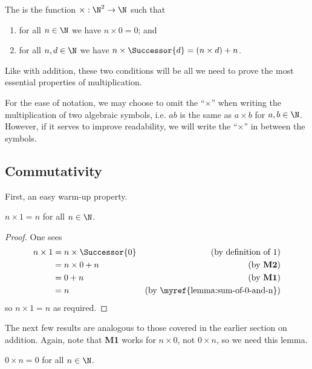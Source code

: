 \begin{definition}[Multiplication]
    The  is the function $\times: \N^2 \to \N$ such that
    \begin{enumerate}[label=\textbf{M\arabic*.}]
        \item for all $n \in \N$ we have $n \times 0 = 0$; and
        \item for all $n, d \in \N$ we have $n \times \Successor{d} = (n \times d) + n$.
    \end{enumerate}
\end{definition}

Like with addition, these two conditions will be all we need to prove the most essential properties of multiplication.

For the ease of notation, we may choose to omit the ``$\times$'' when writing the multiplication of two algebraic symbols, i.e. $ab$ is the same as $a\times b$ for $a,b \in \N$. However, if it serves to improve readability, we will write the ``$\times$'' in between the symbols.

\subsection{Commutativity}
First, an easy warm-up property.

\begin{proposition}\label{prop:multiplication-by-1-right}
    $n \times 1 = n$ for all $n \in \N$.
\end{proposition}
\begin{proof}
    One sees
    \begin{align*}
        n \times 1 &= n \times \Successor{0} & (\text{by definition of 1})\\
        &= n \times 0 + n & (\text{by \textbf{M2}})\\
        &= 0 + n & (\text{by \textbf{M1}})\\
        &= n & (\text{by \myref{lemma:sum-of-0-and-n}})
    \end{align*}
    so $n \times 1 = n$ as required.
\end{proof}

The next few results are analogous to those covered in the earlier section on addition. Again, note that \textbf{M1} works for $n \times 0$, not $0 \times n$, so we need this lemma.

\begin{lemma}\label{lemma:product-of-0-and-n}
    $0 \times n = 0$ for all $n \in \N$.
\end{lemma}

